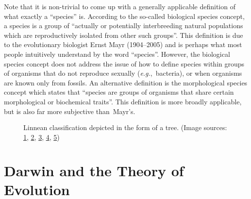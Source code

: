 \documentclass[11pt,a4paper]{book}
\newcommand{\eg}{\emph{e.g.},\ }
\begin{document}
Note that it is non-trivial to come up with a generally applicable definition of what exactly a ``species'' is. According to the so-called biological species concept, a species is a group of ``actually or potentially interbreeding natural populations which are reproductively isolated from other such groups''. This definition is due to the evolutionary biologist Ernst Mayr (1904--2005) and is perhaps what most people intuitively understand by the word ``species''. However, the biological species concept does not address the issue of how to define species within groups of organisms that do not reproduce sexually (\eg bacteria), or when organisms are known only from fossils. An alternative definition is the morphological species concept which states that ``species are groups of organisms that share certain morphological or biochemical traits''. This definition is more broadly applicable, but is also far more subjective than~Mayr's.
\begin{figure}[!t]
\begin{center}
\caption{\small Linnean classification depicted in the form of a tree.
(Image sources:
 \href{http://commons.wikimedia.org/wiki/File:SriLankaLeopard-ZOO-Jihlava.jpg}{1},
 \href{http://commons.wikimedia.org/wiki/File:Striped_Skunk_(Mephitis_mephitis)_DSC_0030.jpg}{2},
 \href{http://commons.wikimedia.org/wiki/File:Lutra_lutra_2_-_Otter,_Owl,_and_Wildlife_Park.jpg}{3},
 \href{http://en.wikipedia.org/wiki/File:Howlsnow.jpg}{4},
 \href{http://commons.wikimedia.org/wiki/File:Canis_latrans.jpg}{5})
}
\label{taxtree}
\end{center}
\end{figure}

\section{Darwin and the Theory of Evolution}
\end{document}
